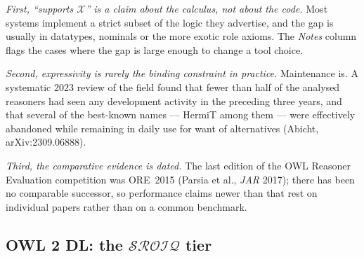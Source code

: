 \documentclass[11pt,a4paper]{article}
\newcommand{\dl}[1]{\ensuremath{\mathcal{#1}}}
\newcommand{\SROIQ}{\dl{SROIQ}}
\begin{document}
\emph{First, ``supports \dl{X}'' is a claim about the calculus, not about the
code.} Most systems implement a strict subset of the logic they advertise, and
the gap is usually in datatypes, nominals or the more exotic role axioms. The
\emph{Notes} column flags the cases where the gap is large enough to change a
tool choice.

\emph{Second, expressivity is rarely the binding constraint in practice.}
Maintenance is. A systematic 2023 review of the field found that fewer than half
of the analysed reasoners had seen any development activity in the preceding
three years, and that several of the best-known names --- HermiT among them ---
were effectively abandoned while remaining in daily use for want of
alternatives (Abicht, arXiv:2309.06888).

\emph{Third, the comparative evidence is dated.} The last edition of the OWL
Reasoner Evaluation competition was ORE~2015 (Parsia et al., \emph{JAR} 2017);
there has been no comparable successor, so performance claims newer than that
rest on individual papers rather than on a common benchmark.

\subsection*{OWL 2 DL: the $\SROIQ$ tier}
\end{document}
